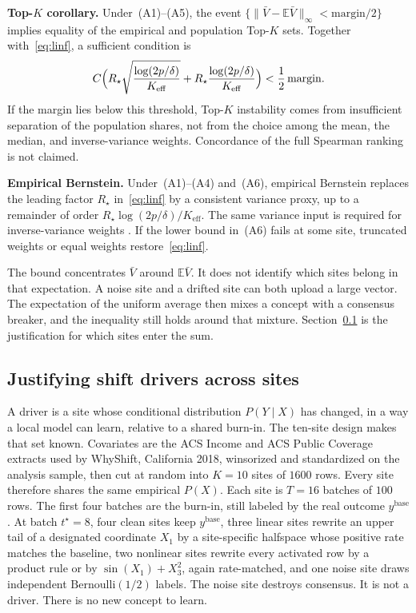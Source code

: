 \par\noindent\textbf{Top-\(K\) corollary.}
Under~(A1)--(A5), the event
\(\{\|\bar V-\mathbb{E}\bar V\|_{\infty}<\mathrm{margin}/2\}\) implies
equality of the empirical and population Top-\(K\) sets.
Together with~\eqref{eq:linf}, a sufficient condition is
\[
C\Bigl(
R_{\star}\sqrt{\frac{\log(2p/\delta)}{K_{\mathrm{eff}}}}
+
R_{\star}\frac{\log(2p/\delta)}{K_{\mathrm{eff}}}
\Bigr)
<
\frac12\,\mathrm{margin}.
\]
If the margin lies below this threshold, Top-\(K\) instability comes from
insufficient separation of the population shares, not from the choice
among the mean, the median, and inverse-variance weights.
Concordance of the full Spearman ranking is not claimed.

\par\noindent\textbf{Empirical Bernstein.}
Under~(A1)--(A4) and~(A6), empirical Bernstein
\cite{wainwright2019high,vershynin2018high} replaces the leading factor
\(R_{\star}\) in~\eqref{eq:linf} by a consistent variance proxy, up to a
remainder of order \(R_{\star}\log(2p/\delta)/K_{\mathrm{eff}}\).
The same variance input is required for inverse-variance weights
\cite{dersim}.
If the lower bound in~(A6) fails at some site, truncated weights or equal
weights restore~\eqref{eq:linf}.

The bound concentrates \(\bar V\) around \(\mathbb{E}\bar V\).
It does not identify which sites belong in that expectation.
A noise site and a drifted site can both upload a large vector.
The expectation of the uniform average then mixes a concept with a
consensus breaker, and the inequality still holds around that mixture.
Section~\ref{sec:drivers} is the justification for which sites enter the
sum.

\subsection{Justifying shift drivers across sites}
\label{sec:drivers}

A driver is a site whose conditional distribution \(P(Y\mid X)\) has
changed, in a way a local model can learn, relative to a shared burn-in.
The ten-site design makes that set known.
Covariates are the ACS Income and ACS Public Coverage extracts used by
WhyShift, California 2018, winsorized and standardized on the analysis
sample, then cut at random into \(K=10\) sites of \(1600\) rows.
Every site therefore shares the same empirical \(P(X)\).
Each site is \(T=16\) batches of \(100\) rows.
The first four batches are the burn-in, still labeled by the real outcome
\(y^{\mathrm{base}}\).
At batch \(t^{\star}=8\), four clean sites keep \(y^{\mathrm{base}}\),
three linear sites rewrite an upper tail of a designated coordinate
\(X_1\) by a site-specific halfspace whose positive rate matches the
baseline, two nonlinear sites rewrite every activated row by a product
rule or by \(\sin(X_1)+X_3^2\), again rate-matched, and one noise site
draws independent \(\mathrm{Bernoulli}(1/2)\) labels.
The noise site destroys consensus.
It is not a driver.
There is no new concept to learn.

